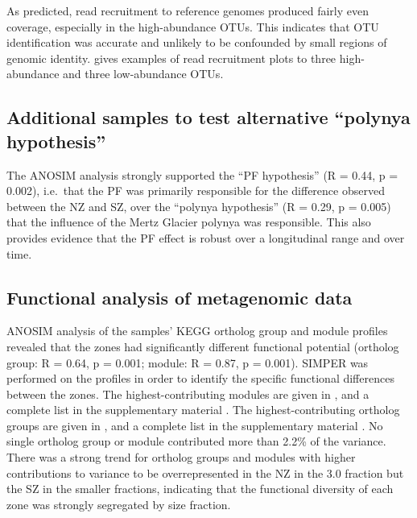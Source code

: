 As predicted, read recruitment to reference genomes produced fairly even coverage, especially in the high-abundance \acp{OTU}.
This indicates that \ac{OTU} identification was accurate and unlikely to be confounded by small regions of genomic identity.
 gives examples of read recruitment plots to three high-abundance and three low-abundance \acp{OTU}.



\subsection{Additional samples to test alternative ``polynya hypothesis''}
The \ac{ANOSIM} analysis strongly supported the ``\ac{PF} hypothesis'' (R = 0.44, p = 0.002), i.e.\ that the \ac{PF} was primarily responsible for the difference observed between the \ac{NZ} and \ac{SZ}, over the ``polynya hypothesis'' (R = 0.29, p = 0.005) that the influence of the Mertz Glacier polynya was responsible.
This also provides evidence that the \ac{PF} effect is robust over a longitudinal range and over time.

\subsection{Functional analysis of metagenomic data}

\ac{ANOSIM} analysis of the samples' \ac{KEGG} ortholog group and module profiles revealed that the zones had significantly different functional potential (ortholog group: R = 0.64, p = 0.001; module: R = 0.87, p = 0.001). 
\ac{SIMPER} was performed on the profiles in order to identify the specific functional differences between the zones. 
The highest-contributing modules are given in , and a complete list in the supplementary material .
The highest-contributing ortholog groups are given in , and a complete list in the supplementary material .
No single ortholog group or module contributed more than 2.2\% of the variance. 
There was a strong trend for ortholog groups and modules with higher contributions to variance to be overrepresented in the \ac{NZ} in the 3.0 \micron{} fraction but the \ac{SZ} in the smaller fractions, indicating that the functional diversity of each zone was strongly segregated by size fraction.





